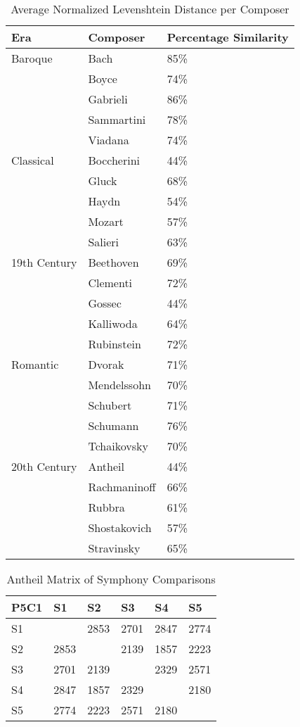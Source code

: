 \begin{longtable}{|l|l|l|}
\caption{Average Normalized Levenshtein Distance per Composer}
\label{my-label}\\
\hline
Era & Composer & Percentage Similarity \\ \hline
\endfirsthead
%
\endhead
%
Baroque & Bach & 85\% \\ \hline
 & Boyce & 74\% \\ \hline
 & Gabrieli & 86\% \\ \hline
 & Sammartini & 78\% \\ \hline
 & Viadana & 74\% \\ \hline
Classical & Boccherini & 44\% \\ \hline
 & Gluck & 68\% \\ \hline
 & Haydn & 54\% \\ \hline
 & Mozart & 57\% \\ \hline
 & Salieri & 63\% \\ \hline
19th Century & Beethoven & 69\% \\ \hline
 & Clementi & 72\% \\ \hline
 & Gossec & 44\% \\ \hline
 & Kalliwoda & 64\% \\ \hline
 & Rubinstein & 72\% \\ \hline
Romantic & Dvorak & 71\% \\ \hline
 & Mendelssohn & 70\% \\ \hline
 & Schubert & 71\% \\ \hline
 & Schumann & 76\% \\ \hline
 & Tchaikovsky & 70\% \\ \hline
20th Century & Antheil & 44\% \\ \hline
 & Rachmaninoff & 66\% \\ \hline
 & Rubbra & 61\% \\ \hline
 & Shostakovich & 57\% \\ \hline
 & Stravinsky & 65\% \\ \hline
\end{longtable}

\begin{longtable}{|l|l|l|l|l|l|}
\caption{Antheil Matrix of Symphony Comparisons}
\label{my-label}\\
\hline
P5C1 & S1 & S2 & S3 & S4 & S5 \\ \hline
\endfirsthead
%
\endhead
%
S1 &  & 2853 & 2701 & 2847 & 2774 \\ \hline
S2 & 2853 &  & 2139 & 1857 & 2223 \\ \hline
S3 & 2701 & 2139 &  & 2329 & 2571 \\ \hline
S4 & 2847 & 1857 & 2329 &  & 2180 \\ \hline
S5 & 2774 & 2223 & 2571 & 2180 &  \\ \hline
\end{longtable}

